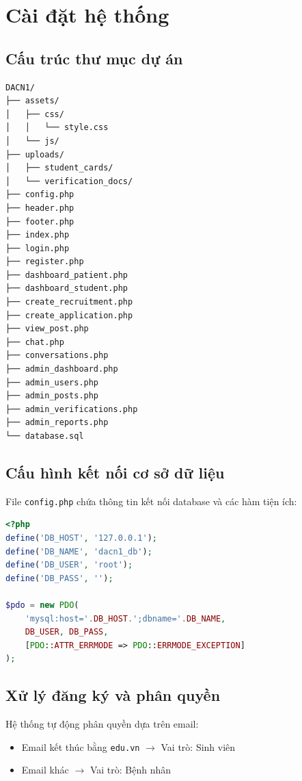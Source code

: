 \documentclass[a4paper,12pt]{report}
\begin{document}
\section{Cài đặt hệ thống}

\subsection{Cấu trúc thư mục dự án}

\begin{verbatim}
DACN1/
├── assets/
│   ├── css/
│   │   └── style.css
│   └── js/
├── uploads/
│   ├── student_cards/
│   └── verification_docs/
├── config.php
├── header.php
├── footer.php
├── index.php
├── login.php
├── register.php
├── dashboard_patient.php
├── dashboard_student.php
├── create_recruitment.php
├── create_application.php
├── view_post.php
├── chat.php
├── conversations.php
├── admin_dashboard.php
├── admin_users.php
├── admin_posts.php
├── admin_verifications.php
├── admin_reports.php
└── database.sql
\end{verbatim}

\subsection{Cấu hình kết nối cơ sở dữ liệu}

File \texttt{config.php} chứa thông tin kết nối database và các hàm tiện ích:

\begin{lstlisting}[language=PHP]
<?php
define('DB_HOST', '127.0.0.1');
define('DB_NAME', 'dacn1_db');
define('DB_USER', 'root');
define('DB_PASS', '');

$pdo = new PDO(
    'mysql:host='.DB_HOST.';dbname='.DB_NAME,
    DB_USER, DB_PASS,
    [PDO::ATTR_ERRMODE => PDO::ERRMODE_EXCEPTION]
);
\end{lstlisting}

\subsection{Xử lý đăng ký và phân quyền}

Hệ thống tự động phân quyền dựa trên email:
\begin{itemize}
    \item Email kết thúc bằng \texttt{edu.vn} $\rightarrow$ Vai trò: Sinh viên
    \item Email khác $\rightarrow$ Vai trò: Bệnh nhân
\end{itemize}
\end{document}
